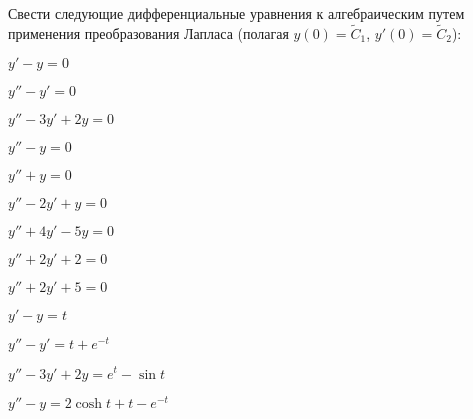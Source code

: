 
	Свести следующие дифференциальные уравнения к алгебраическим путем применения преобразования Лапласа (полагая $y(0) = \tilde{C}_1$, $y'(0) = \tilde{C}_2$):

	\begin{multicols}{3}
		\begin{enumtasks}

			\item \( y' - y = 0 \)
			\item \( y'' - y' = 0 \)
			\item \( y'' - 3y' + 2y = 0 \)
			\item \( y'' - y = 0 \)
			\item \( y'' + y = 0 \)
			\item \( y'' - 2y' + y = 0 \)
			\item \( y'' + 4y' - 5y = 0 \)
			\item \( y'' + 2y' + 2 = 0 \)
			\item \( y'' + 2y' + 5 = 0 \)

		\end{enumtasks}
	\end{multicols}

	\vspace{15pt}

	\begin{multicols}{2}
		\begin{enumtasks}

			\item \( y' - y = t \)
			\item \( y'' - y' = t + e^{-t} \)
			\item \( y'' - 3y' + 2y = e^{t} - \sin{t} \)
			\item \( y'' - y = 2\cosh{t} + t - e^{-t} \)

		\end{enumtasks}
	\end{multicols}